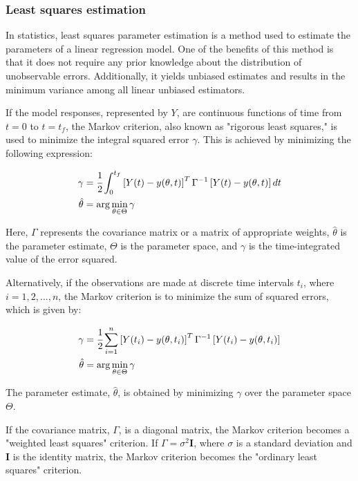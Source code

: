 \documentclass[../Article_Model_Parameters.tex]{subfiles}
\begin{document}
\subsubsection{Least squares estimation}
In statistics, least squares parameter estimation is a method used to estimate the parameters of a linear regression model. One of the benefits of this method is that it does not require any prior knowledge about the distribution of unobservable errors. Additionally, it yields unbiased estimates and results in the minimum variance among all linear unbiased estimators.

If the model responses, represented by $Y$, are continuous functions of time from $t = 0$ to $t = t_f$, the Markov criterion, also known as "rigorous least squares," is used to minimize the integral squared error $\gamma$. This is achieved by minimizing the following expression:

{\footnotesize
	\begin{align}
		\gamma &= \cfrac{1}{2} \int_{0}^{t_f} \left[ Y(t) - y(\theta,t) \right]^T \Gamma^{-1} \left[ Y(t) - y(\theta,t) \right] dt \\
		\hat{\theta} &= \arg \min_{\theta \in \Theta} \gamma
\end{align} }

Here, $\Gamma$ represents the covariance matrix or a matrix of appropriate weights, $\hat{\theta}$ is the parameter estimate, $\Theta$ is the parameter space, and $\gamma$ is the time-integrated value of the error squared.

Alternatively, if the observations are made at discrete time intervals $t_i$, where $i = 1, 2, \dots, n$, the Markov criterion is to minimize the sum of squared errors, which is given by:

{\footnotesize
	\begin{align}
		\gamma &= \cfrac{1}{2} \sum_{i=1}^{n} \left[ Y(t_i) - y(\theta,t_i) \right]^T \Gamma^{-1} \left[ Y(t_i) - y(\theta,t_i) \right] \\
		\hat{\theta} &= \arg \min_{\theta \in \Theta} \gamma
\end{align} }

The parameter estimate, $\hat{\theta}$, is obtained by minimizing $\gamma$ over the parameter space $\Theta$.

If the covariance matrix, $\Gamma$, is a diagonal matrix, the Markov criterion becomes a "weighted least squares" criterion. If $\Gamma = \sigma^2 \textbf{I}$, where $\sigma$ is a standard deviation and $\textbf{I}$ is the identity matrix, the Markov criterion becomes the "ordinary least squares" criterion.
\end{document}
